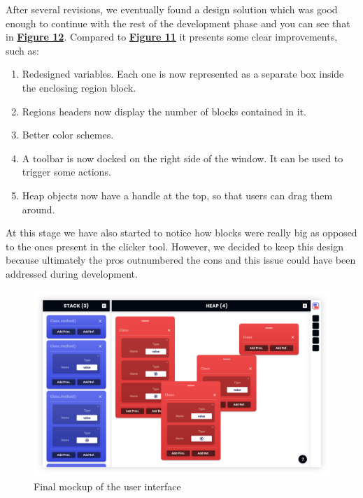\documentclass[]{usiinfbachelorproject}
\begin{document}
\noindent After several revisions, we eventually found a design solution which was good enough to continue with the rest of the development phase and you can see that in \hyperref[final ui]{\textbf{Figure 12}}. Compared to \hyperref[separate regions]{\textbf{Figure 11}} it presents some clear improvements, such as:

\begin{enumerate}
	\item Redesigned variables. Each one is now represented as a separate box inside the enclosing region block.
	\item Regions headers now display the number of blocks contained in it.
	\item Better color schemes.
	\item A toolbar is now docked on the right side of the window. It can be used to trigger some actions.
	\item Heap objects now have a handle at the top, so that users can drag them around.
\end{enumerate}

\noindent At this stage we have also started to notice how blocks were really big as opposed to the ones present in the clicker tool. However, we decided to keep this design because ultimately the pros outnumbered the cons and this issue could have been addressed during development.

\vspace{\fill}
\pagebreak

\begin{figure}[h!]
\centering
\includegraphics[width=\textwidth]{figures/final_mockup.png}
\caption {Final mockup of the user interface}
\label{final ui}
\end{figure}
\end{document}
